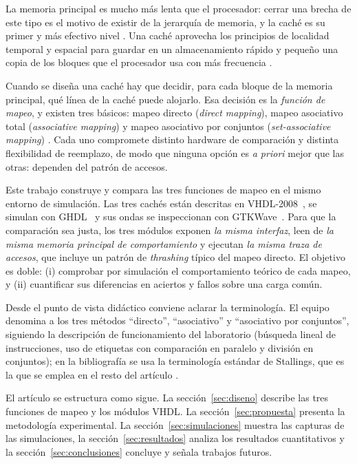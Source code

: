 \documentclass[llncs]{llncs}
\begin{document}
La memoria principal es mucho más lenta que el procesador: cerrar una
brecha de este tipo es el motivo de existir de la jerarquía de
memoria, y la caché es su primer y más efectivo nivel
\cite{stallings2019,hennessy2019,tanenbaum2013}. Una caché aprovecha
los principios de localidad temporal y espacial \cite{wikipedia-locality}
para guardar en un almacenamiento
rápido y pequeño una copia de los bloques que el procesador usa con
más frecuencia \cite{patterson2017,bryant2015}.

Cuando se diseña una caché hay que decidir, para cada bloque de la
memoria principal, qué línea de la caché puede alojarlo. Esa decisión
es la \emph{función de mapeo}, y existen tres básicos: mapeo directo
(\emph{direct mapping}), mapeo asociativo total (\emph{associative
mapping}) y mapeo asociativo por conjuntos (\emph{set-associative
mapping})
\cite{stallings2019,wikipedia-cache,null2024}. Cada uno compromete
distinto hardware de comparación y distinta flexibilidad de
reemplazo, de modo que ninguna opción es \emph{a priori} mejor que
las otras: dependen del patrón de accesos.

Este trabajo construye y compara las tres funciones de mapeo en el
mismo entorno de simulación. Las tres cachés están descritas en
VHDL-2008~\cite{ieee1076}, se simulan con GHDL~\cite{ghdl-docs} y sus ondas
se
inspeccionan con GTKWave~\cite{gtkwave-docs}. Para que la comparación
sea justa, los tres módulos exponen \emph{la misma interfaz}, leen de
\emph{la misma memoria principal de comportamiento} y ejecutan
\emph{la misma traza de accesos}, que incluye un patrón de
\emph{thrashing} típico del mapeo directo. El objetivo es doble:
(i) comprobar por simulación el comportamiento teórico de cada
mapeo, y (ii) cuantificar sus diferencias en aciertos y fallos sobre
una carga común.

Desde el punto de vista didáctico conviene aclarar la terminología. El
equipo denomina a los tres métodos ``directo'', ``asociativo'' y
``asociativo por conjuntos'', siguiendo la descripción de funcionamiento
del laboratorio (búsqueda lineal de instrucciones, uso de etiquetas
con comparación en paralelo y división en conjuntos); en la
bibliografía se usa la terminología estándar de Stallings, que es la
que se emplea en el resto del artículo \cite{stallings2019}.

El artículo se estructura como sigue. La sección~\ref{sec:diseno}
describe las tres funciones de mapeo y los módulos VHDL. La
sección~\ref{sec:propuesta} presenta la metodología experimental. La
sección~\ref{sec:simulaciones} muestra las capturas de las
simulaciones, la sección~\ref{sec:resultados} analiza los resultados
cuantitativos y la sección~\ref{sec:conclusiones} concluye y señala
trabajos futuros.
\end{document}
